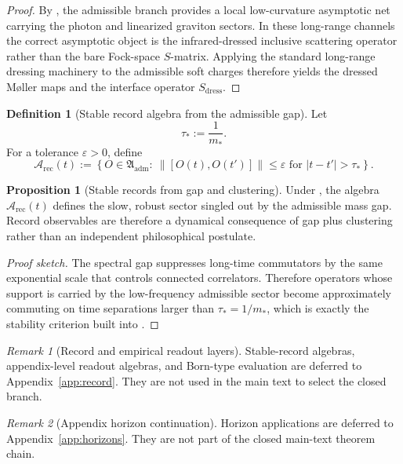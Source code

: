 \documentclass[11pt,a4paper]{article}
\theoremstyle{definition}
\newtheorem{definition}[theorem]{Definition}
\newtheorem{proposition}[theorem]{Proposition}
\theoremstyle{remark}
\newtheorem*{remark}{Remark}
\newcommand{\Arec}{\mathcal A_{\mathrm{rec}}}
\begin{document}
\begin{proof}
By , the admissible branch
provides a local low-curvature asymptotic net carrying the photon and linearized graviton sectors.
In these long-range channels the correct asymptotic object is the infrared-dressed inclusive
scattering operator rather than the bare Fock-space $S$-matrix. Applying the standard long-range
dressing machinery to the admissible soft charges therefore yields the dressed M\o ller maps and
the interface operator $S_{\mathrm{dress}}$.
\end{proof}

\begin{definition}[Stable record algebra from the admissible gap]
\label{def:stable-record-algebra}
Let
\[
\tau_*:=\frac{1}{m_*}.
\]
For a tolerance $\varepsilon>0$, define
\[
\Arec(t)
:=
\left\{
O\in\mathfrak A_{\mathrm{adm}}
:\ \|[O(t),O(t')]\|\le\varepsilon
\text{ for } |t-t'|>\tau_*
\right\}.
\]
\end{definition}

\begin{proposition}[Stable records from gap and clustering]
Under , the algebra $\Arec(t)$ defines the slow, robust sector singled out by the admissible mass gap. Record observables are therefore a dynamical consequence of gap plus clustering rather than an independent philosophical postulate.
\end{proposition}

\begin{proof}[Proof sketch]
The spectral gap suppresses long-time commutators by the same exponential scale that controls connected correlators. Therefore operators whose support is carried by the low-frequency admissible sector become approximately commuting on time separations larger than $\tau_*=1/m_*$, which is exactly the stability criterion built into .
\end{proof}

\begin{remark}[Record and empirical readout layers]
Stable-record algebras, appendix-level readout algebras, and Born-type evaluation are deferred to
Appendix~\ref{app:record}. They are not used in the main text to select the closed branch.
\end{remark}

\begin{remark}[Appendix horizon continuation]
Horizon applications are deferred to Appendix~\ref{app:horizons}. They are not part of the closed
main-text theorem chain.
\end{remark}
\end{document}
